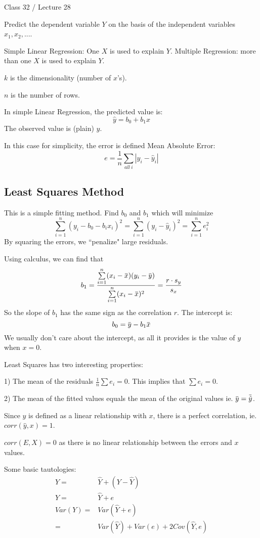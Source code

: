 \documentclass[11pt, oneside]{article}   	%
\newcommand{\overbar}[1]{\mkern 1.5mu\overline{\mkern-1.5mu#1\mkern-1.5mu}\mkern 1.5mu}
\begin{document}
Class 32 / Lecture 28

Predict the dependent variable $Y$ on the basis of the independent variables $x_1, x_2, ... $.

Simple Linear Regression: One $X$ is used to explain $Y$. Multiple Regression: more than one $X$ is used to explain $Y$.

$k$ is the dimensionality (number of $x$'s).

$n$ is the number of rows.

In simple Linear Regression, the predicted value is:
\[
\hat{y} = b_0 + b_1x
\]
The observed value is (plain) $y$.

In this case for simplicity, the error is defined Mean Absolute Error:
\[
e = \frac{1}{n} \sum\limits_{all\  i} |y_i - \hat{y}_i|
\]

\subsection{Least Squares Method}

This is a simple fitting method. Find $b_0$ and $b_1$ which will minimize
\[
\sum\limits_{i=1}^n (y_i - b_0 - b_ix_i)^2 = \sum\limits_{i=1}^{n} (y_i - \hat{y}_i)^2 = \sum\limits_{i=1}^n e_i^2
\]
By squaring the errors, we ``penalize" large residuals.

Using calculus, we can find that 
\[
b_1 = \frac{ \sum\limits_{i=1}^n (x_i - \overbar{x}) (y_i - \overbar{y}) } { \sum\limits_{i=1}^n (x_i - \overbar{x})^2}  = \frac{r\cdot s_y} { s_x}
\]
So the slope of $b_1$ has the same sign as the correlation $r$. The intercept is:
\[
b_0 = \overbar{y} - b_1\overbar{x}
\]
We usually don't care about the intercept, as all it provides is the value of $y$ when $x = 0$.

Least Squares has two interesting properties:

1) The mean of the residuals $\frac{1}{n} \sum e_i = 0$. This implies that $\sum e_i = 0$.

2) The mean of the fitted values equals the mean of the original values ie. $\overbar{y} = \overbar{\hat{y}}$.

Since $\hat{y}$ is defined as a linear relationship with $x$, there is a perfect correlation, ie. $corr(\hat{y}, x) = 1$.

$corr(E, X) = 0$ as there is no linear relationship between the errors and $x$ values.

Some basic tautologies:
\begin{align*}
Y =& \hat{Y} + (Y - \hat{Y})\\
Y =& \hat{Y} + e\\
Var(Y) =& Var(\hat{Y} + e) \\
  =& Var(\hat{Y}) + Var(e) + 2Cov(\hat{Y},e)\\
\end{align*}
\end{document}
